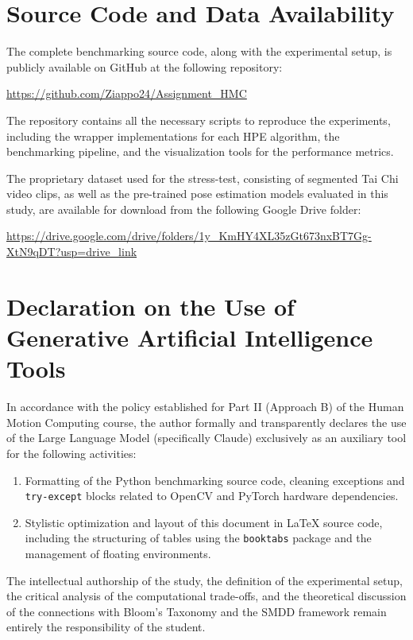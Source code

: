 \documentclass[a4paper,11pt]{article}
\begin{document}
\section{Source Code and Data Availability}
The complete benchmarking source code, along with the experimental setup, is publicly available on GitHub at the following repository:

\url{https://github.com/Ziappo24/Assignment_HMC}

The repository contains all the necessary scripts to reproduce the experiments, including the wrapper implementations for each HPE algorithm, the benchmarking pipeline, and the visualization tools for the performance metrics.

The proprietary dataset used for the stress-test, consisting of segmented Tai Chi video clips, as well as the pre-trained pose estimation models evaluated in this study, are available for download from the following Google Drive folder:

\url{https://drive.google.com/drive/folders/1y_KmHY4XL35zGt673nxBT7Gg-XtN9qDT?usp=drive_link}

\section{Declaration on the Use of Generative Artificial Intelligence Tools}
In accordance with the policy established for Part II (Approach B) of the Human Motion Computing course, the author formally and transparently declares the use of the Large Language Model (specifically Claude) exclusively as an auxiliary tool for the following activities:
\begin{enumerate}
    \item Formatting of the Python benchmarking source code, cleaning exceptions and \texttt{try-except} blocks related to OpenCV and PyTorch hardware dependencies.
    \item Stylistic optimization and layout of this document in LaTeX source code, including the structuring of tables using the \texttt{booktabs} package and the management of floating environments.
\end{enumerate}
The intellectual authorship of the study, the definition of the experimental setup, the critical analysis of the computational trade-offs, and the theoretical discussion of the connections with Bloom's Taxonomy and the SMDD framework remain entirely the responsibility of the student.
\end{document}

